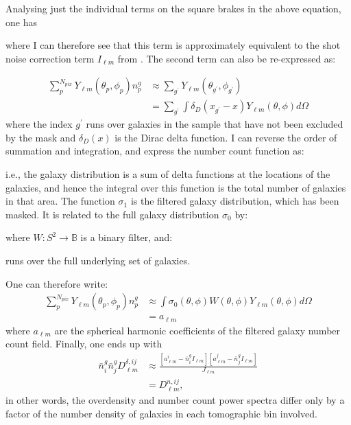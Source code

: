 \qquad Analysing just the individual terms on the square brakes in the above equation, one has

where I can therefore see that this term is approximately equivalent to the shot noise correction term $I_{\ell m}$ from \cite{Blake2007,Thomas2011}. The second term can also be re-expressed as:

\begin{align}
\sum_p^{N_{pix}} Y_{\ell m}(\theta_p,\phi_p) n_p^g &\approx \sum_{g^\prime} Y_{\ell m}(\theta_{g^\prime},\phi_{g^\prime}) \\ \nonumber
								&= \sum_{g^\prime} \int \delta_D(x_{g^\prime}-x) Y_{\ell m}(\theta,\phi) d\Omega
\end{align}
\noindent where the index $g^\prime$ runs over galaxies in the sample that have not been excluded by the mask and $\delta_D(x)$ is the Dirac delta function. I can reverse the order of summation and integration, and express the number count function as:

\noindent i.e., the galaxy distribution is a sum of delta functions at the locations of the galaxies, and hence the integral over this function is the total number of galaxies in that area. The function $\sigma_1$ is the filtered galaxy distribution, which has been masked. It is related to the full galaxy distribution $\sigma_0$ by:

\noindent where $W: S^2 \rightarrow \mathbb{B}$ is a binary filter, and:


\noindent runs over the full underlying set of galaxies.

\qquad One can therefore write:
\begin{align}
\sum_p^{N_{pix}} Y_{\ell m}(\theta_p,\phi_p)n_p^g  & \approx \int \sigma_0(\theta,\phi)W(\theta,\phi)Y_{\ell m}(\theta,\phi)d\Omega \\ & = a_{\ell m}
\end{align}
\noindent where $a_{\ell m}$ are the spherical harmonic coefficients of the filtered galaxy number count field. Finally, one ends up with 
\begin{align}
\bar n^g_i \bar n^g_j D^{\delta, ij}_{\ell m} & \approx  \frac{\left[ a_{\ell m}^i - \bar n_i^g I_{\ell m} \right] \left[ a_{\ell m}^j - \bar n_j^g I_{\ell m} \right]}{J_{\ell m}} \\ & = D^{n,ij}_{\ell m},
\end{align}
in other words, the overdensity and number count power spectra differ only by a factor of the number density of galaxies in each tomographic bin involved.


